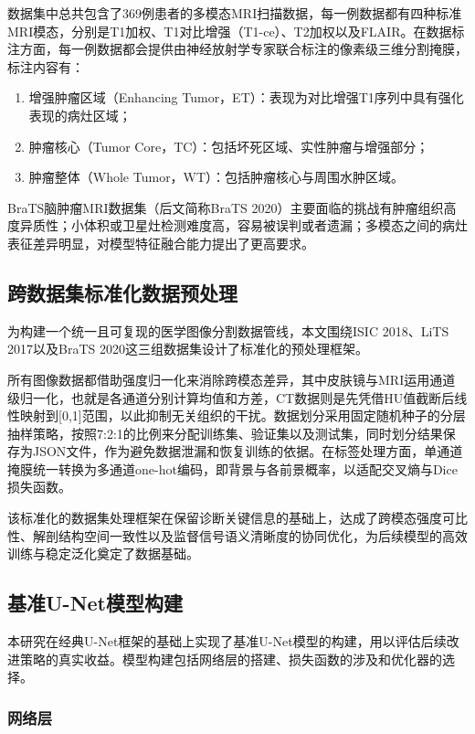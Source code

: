 数据集中总共包含了369例患者的多模态MRI扫描数据，每一例数据都有四种标准MRI模态，分别是T1加权、T1对比增强（T1-ce）、T2加权以及FLAIR。在数据标注方面，每一例数据都会提供由神经放射学专家联合标注的像素级三维分割掩膜，标注内容有：

\begin{enumerate}
    \item 增强肿瘤区域（Enhancing Tumor，ET）：表现为对比增强T1序列中具有强化表现的病灶区域；
    \item 肿瘤核心（Tumor Core，TC）：包括坏死区域、实性肿瘤与增强部分；
    \item 肿瘤整体（Whole Tumor，WT）：包括肿瘤核心与周围水肿区域。
\end{enumerate}

BraTS脑肿瘤MRI数据集（后文简称BraTS 2020）主要面临的挑战有肿瘤组织高度异质性；小体积或卫星灶检测难度高，容易被误判或者遗漏；多模态之间的病灶表征差异明显，对模型特征融合能力提出了更高要求。

\subsection{跨数据集标准化数据预处理}

为构建一个统一且可复现的医学图像分割数据管线，本文围绕ISIC 2018、LiTS 2017以及BraTS 2020这三组数据集设计了标准化的预处理框架。

所有图像数据都借助强度归一化来消除跨模态差异，其中皮肤镜与MRI运用通道级归一化，也就是各通道分别计算均值和方差，CT数据则是先凭借HU值截断后线性映射到[0,1]范围，以此抑制无关组织的干扰。数据划分采用固定随机种子的分层抽样策略，按照7:2:1的比例来分配训练集、验证集以及测试集，同时划分结果保存为JSON文件，作为避免数据泄漏和恢复训练的依据。在标签处理方面，单通道掩膜统一转换为多通道one-hot编码，即背景与各前景概率，以适配交叉熵与Dice损失函数。

该标准化的数据集处理框架在保留诊断关键信息的基础上，达成了跨模态强度可比性、解剖结构空间一致性以及监督信号语义清晰度的协同优化，为后续模型的高效训练与稳定泛化奠定了数据基础。

\subsection{基准U-Net模型构建}

本研究在经典U-Net框架的基础上实现了基准U-Net模型的构建，用以评估后续改进策略的真实收益。模型构建包括网络层的搭建、损失函数的涉及和优化器的选择。

\subsubsection{网络层}

